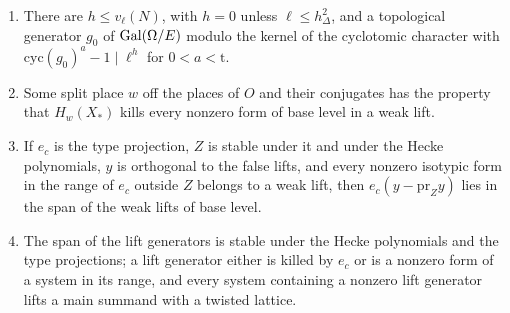 \begin{lemma}\label{lem:denominator-inputs}
\begin{enumerate}[label=\textup{(\alph*)}]
\item There are $h\le v_\ell(N)$, with $h=0$ unless $\ell\le h_\Delta^2$, and a topological generator $g_0$ of $\operatorname{Gal}(\Omega/E)$ modulo the kernel of the cyclotomic character with $\mathrm{cyc}(g_0)^a-1\mid\ell^h$ for $0<a<\mathrm t$.
\item Some split place $w$ off the places of $O$ and their conjugates has the property that $H_w(X_*)$ kills every nonzero form of base level in a weak lift.
\item If $e_c$ is the type projection, $Z$ is stable under it and under the Hecke polynomials, $y$ is orthogonal to the false lifts, and every nonzero isotypic form in the range of $e_c$ outside $Z$ belongs to a weak lift, then
$e_c(y-\mathrm{pr}_Zy)$ lies in the span of the weak lifts of base level.
\item The span of the lift generators is stable under the Hecke polynomials and the type projections; a lift generator either is killed by $e_c$ or is a nonzero form of a system in its range, and every system containing a nonzero lift
generator lifts a main summand with a twisted lattice.
\end{enumerate}
\end{lemma}

